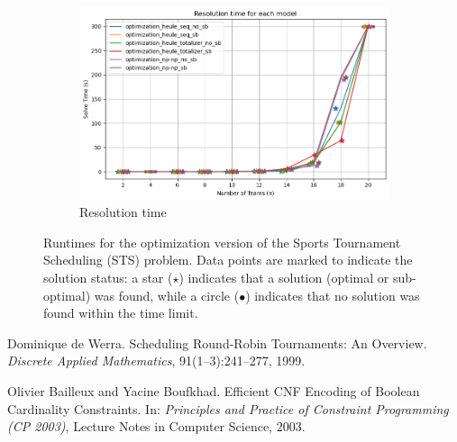 \documentclass{article}
\begin{document}
\begin{figure}[H]
    \centering
    \begin{subfigure}{0.49\linewidth}
        \centering
        \includegraphics[width=\linewidth]{imgs/output.png}
        \caption{Resolution time}
    \end{subfigure}
    \caption{Runtimes for the optimization version of the Sports Tournament Scheduling (STS) problem. Data points are marked to indicate the solution status: a star ($\star$) indicates that a solution (optimal or sub-optimal) was found, while a circle ($\bullet$) indicates that no solution was found within the time limit.}
\end{figure}





\begin{thebibliography}{9}

Dominique de Werra.
\newblock Scheduling Round-Robin Tournaments: An Overview.
\newblock \emph{Discrete Applied Mathematics}, 91(1–3):241--277, 1999.

Olivier Bailleux and Yacine Boufkhad.
\newblock Efficient CNF Encoding of Boolean Cardinality Constraints.
\newblock In: \emph{Principles and Practice of Constraint Programming (CP 2003)}, Lecture Notes in Computer Science, 2003.
\end{thebibliography}
\end{document}
